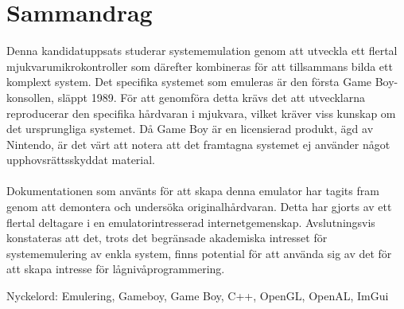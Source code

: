 \thispagestyle{plain}			%
\setlength{\parskip}{0pt plus 1.0pt}
\section*{\centering Sammandrag}
Denna kandidatuppsats studerar systememulation genom att utveckla ett flertal mjukvarumikrokontroller som därefter kombineras för att tillsammans bilda ett komplext system. Det specifika systemet som emuleras är den första Game Boy-konsollen, släppt 1989. För att genomföra detta krävs det att utvecklarna reproducerar den specifika hårdvaran i mjukvara, vilket kräver viss kunskap om det ursprungliga systemet. 
Då Game Boy är en licensierad produkt, ägd av Nintendo, är det värt att notera att det framtagna systemet ej använder något upphovsrättsskyddat material.
\\\\
Dokumentationen som använts för att skapa denna emulator har tagits fram genom att demontera och undersöka originalhårdvaran. Detta har gjorts av ett flertal deltagare i en emulatorintresserad internetgemenskap. Avslutningsvis konstateras att det, trots det begränsade akademiska intresset för systememulering av enkla system, finns potential för att använda sig av det för att skapa intresse för lågnivåprogrammering.







\vfill
Nyckelord: Emulering, Gameboy, Game Boy, C++, OpenGL, OpenAL, ImGui

\newpage				%
\thispagestyle{plain}
\mbox{}